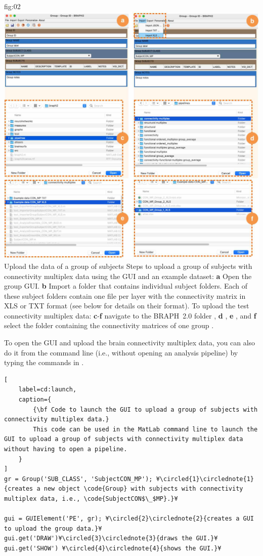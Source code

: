 \documentclass[justified]{tufte-handout}
\begin{document}
	{fig:02}
	{
	\includegraphics{fig02.jpg}
	}
	{Upload the data of a group of subjects}
	{
	Steps to upload a group of subjects with connectivity multiplex data using the GUI and an example dataset: 
	{\bf a} Open the group GUI.
	{\bf b} Import a folder that contains individual subject folders. Each of these subject folders contain one file per layer with the connectivity matrix in XLS or TXT format (see below for details on their format).
	To upload the test connectivity multiplex data:
	{\bf c}-{\bf f} navigate to the BRAPH~2.0 folder , {\bf d} ,  {\bf e} , and {\bf f} select the folder containing the connectivity matrices of one group .
	}
 
To open the GUI and upload the brain connectivity multiplex data, you can also do it from the command line (i.e., without opening an analysis pipeline) by typing the commands in . 
%
\begin{lstlisting}[
	label=cd:launch,
	caption={
		{\bf Code to launch the GUI to upload a group of subjects with connectivity multiplex data.}
		This code can be used in the MatLab command line to launch the GUI to upload a group of subjects with connectivity multiplex data without having to open a pipeline.
	}
]
gr = Group('SUB_CLASS', 'SubjectCON_MP'); ¥\circled{1}\circlednote{1}{creates a new object \code{Group} with subjects with connectivity multiplex data, i.e., \code{SubjectCON$\_$MP}.}¥

gui = GUIElement('PE', gr); ¥\circled{2}\circlednote{2}{creates a GUI to upload the group data.}¥
gui.get('DRAW')¥\circled{3}\circlednote{3}{draws the GUI.}¥
gui.get('SHOW') ¥\circled{4}\circlednote{4}{shows the GUI.}¥
\end{lstlisting}
\end{document}
